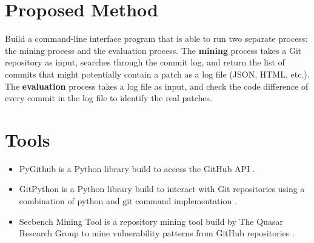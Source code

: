 \documentclass[12pt, a4paper]{report}
\begin{document}
\section{Proposed Method}
Build a command-line interface program that is able to run two separate process: the mining process
and the evaluation process. The \textbf{mining} process takes a Git repository as input, searches
through the commit log, and return the list of commits that might potentially contain a patch as a
log file (JSON, HTML, etc.). The \textbf{evaluation} process takes a log file as input, and check
the code difference of every commit in the log file to identify the real patches.

\section{Tools}
\begin{itemize}
	\item PyGithub is a Python library build to access the GitHub API \cite{pygithub}.
	\item GitPython is a Python library build to interact with Git repositories using a combination of
	python and git command implementation \cite{gitpython}.
	\item Secbench Mining Tool is a repository mining tool build by The Quasar Research Group to mine
	vulnerability patterns from GitHub repositories \cite{secbench}.
\end{itemize}





\printbibliography[heading=bibintoc]
\end{document}

